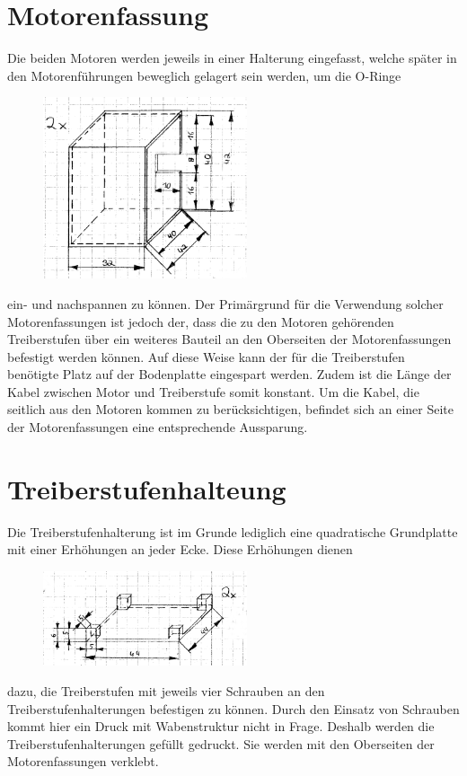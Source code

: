 \section{Motorenfassung}
Die beiden Motoren werden jeweils in einer Halterung eingefasst, welche später in den Motorenführungen beweglich gelagert sein werden, um die O-Ringe 
\begin{figure}
	\includegraphics[width=6cm,angle=0]{content/pictures/motorenfassung.png}
\end{figure}
ein- und nachspannen zu können. Der Primärgrund für die Verwendung solcher Motorenfassungen ist jedoch der, dass die zu den Motoren gehörenden Treiberstufen über ein weiteres Bauteil an den Oberseiten der Motorenfassungen befestigt werden können. Auf diese Weise kann der für die Treiberstufen benötigte Platz auf der Bodenplatte eingespart werden. Zudem ist die Länge der Kabel zwischen Motor und Treiberstufe somit konstant. Um die Kabel, die seitlich aus den Motoren kommen zu berücksichtigen, befindet sich an einer Seite der Motorenfassungen eine entsprechende Aussparung.

\section{Treiberstufenhalteung}
Die Treiberstufenhalterung ist im Grunde lediglich eine quadratische Grundplatte mit einer Erhöhungen an jeder Ecke. Diese Erhöhungen dienen
\begin{figure}
	\includegraphics[width=6cm,angle=0]{content/pictures/treiberstufenhalterung.png}
\end{figure}
dazu, die Treiberstufen mit jeweils vier Schrauben an den Treiberstufenhalterungen befestigen zu können. Durch den Einsatz von Schrauben kommt hier ein Druck mit Wabenstruktur nicht in Frage. Deshalb werden die Treiberstufenhalterungen gefüllt gedruckt. Sie werden mit den Oberseiten der Motorenfassungen verklebt. 

